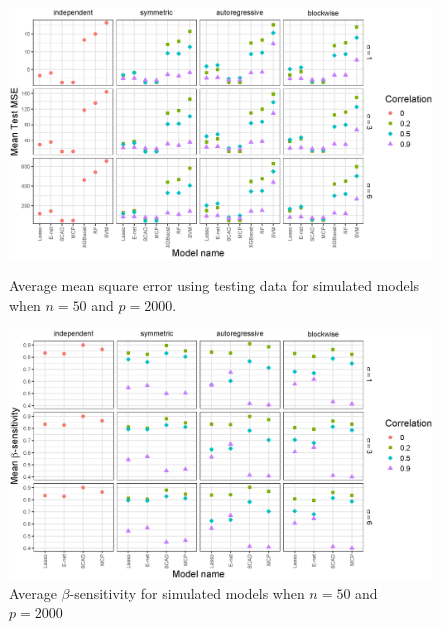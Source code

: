 \documentclass{article}
\begin{document}
\begin{figure}[h!]
	\centering
	\includegraphics[width = \textwidth]{images/facet-test-mse/facet_test_mse_50_2000.eps}
	\captionsetup{width = 0.8\textwidth}
	\caption{Average mean square error using testing data for simulated models when $n = 50$ and $p = 2000$.}
	\label{fig:test-mse-50-2000}
	
	\bigskip
	
	\includegraphics[width = \textwidth]{images/facet-sensitivity/facet_sensitivity_50_2000.eps}
	\captionsetup{width = 0.8\textwidth}
	\caption{Average $\beta$-sensitivity for simulated models when $n = 50$ and $p = 2000$}
	\label{fig:sensitivity-50-2000}
\end{figure}
\end{document}
